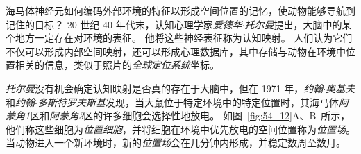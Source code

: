 海马体神经元如何编码外部环境的特征以形成空间位置的记忆，使动物能够导航到记住的目标？
20 世纪 40 年代末，认知心理学家\textit{爱德华$\cdot$托尔曼}提出，大脑中的某个地方一定存在对环境的表征。
他将这些神经表征称为认知映射。
人们认为它们不仅可以形成内部空间映射，还可以形成心理数据库，其中存储与动物在环境中位置相关的信息，类似于照片的\textit{全球定位系统}坐标。


\textit{托尔曼}没有机会确定认知映射是否真的存在于大脑中，但在 1971 年，\textit{约翰$\cdot$奥基夫}和\textit{约翰$\cdot$多斯特罗夫斯基}发现，当大鼠位于特定环境中的特定位置时，其海马体\textit{阿蒙角1}区和\textit{阿蒙角3}区的许多细胞会选择性地放电。
如图~\ref{fig:54_12}A、B~所示，他们称这些细胞为\textit{位置细胞}，并将细胞在环境中优先放电的空间位置称为\textit{位置场}。
当动物进入一个新环境时，新的\textit{位置场}会在几分钟内形成，并稳定数周至数月。


